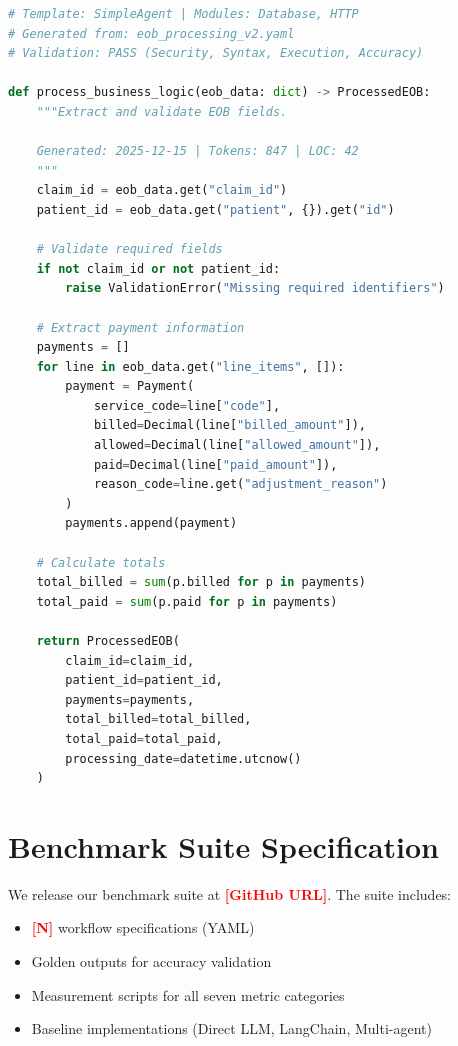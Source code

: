 \documentclass[11pt]{article}
\newcommand{\placeholder}[1]{\textcolor{red}{\textbf{[#1]}}}
\begin{document}
\begin{lstlisting}[language=Python, caption={Generated Temporal activity (business logic only)}, basicstyle=\small\ttfamily]
# Template: SimpleAgent | Modules: Database, HTTP
# Generated from: eob_processing_v2.yaml
# Validation: PASS (Security, Syntax, Execution, Accuracy)

def process_business_logic(eob_data: dict) -> ProcessedEOB:
    """Extract and validate EOB fields.
    
    Generated: 2025-12-15 | Tokens: 847 | LOC: 42
    """
    claim_id = eob_data.get("claim_id")
    patient_id = eob_data.get("patient", {}).get("id")
    
    # Validate required fields
    if not claim_id or not patient_id:
        raise ValidationError("Missing required identifiers")
    
    # Extract payment information
    payments = []
    for line in eob_data.get("line_items", []):
        payment = Payment(
            service_code=line["code"],
            billed=Decimal(line["billed_amount"]),
            allowed=Decimal(line["allowed_amount"]),
            paid=Decimal(line["paid_amount"]),
            reason_code=line.get("adjustment_reason")
        )
        payments.append(payment)
    
    # Calculate totals
    total_billed = sum(p.billed for p in payments)
    total_paid = sum(p.paid for p in payments)
    
    return ProcessedEOB(
        claim_id=claim_id,
        patient_id=patient_id,
        payments=payments,
        total_billed=total_billed,
        total_paid=total_paid,
        processing_date=datetime.utcnow()
    )
\end{lstlisting}

\section{Benchmark Suite Specification}
\label{app:benchmark}

We release our benchmark suite at \placeholder{GitHub URL}. The suite includes:

\begin{itemize}
    \item \placeholder{N} workflow specifications (YAML)
    \item Golden outputs for accuracy validation
    \item Measurement scripts for all seven metric categories
    \item Baseline implementations (Direct LLM, LangChain, Multi-agent)
\end{itemize}
\end{document}

